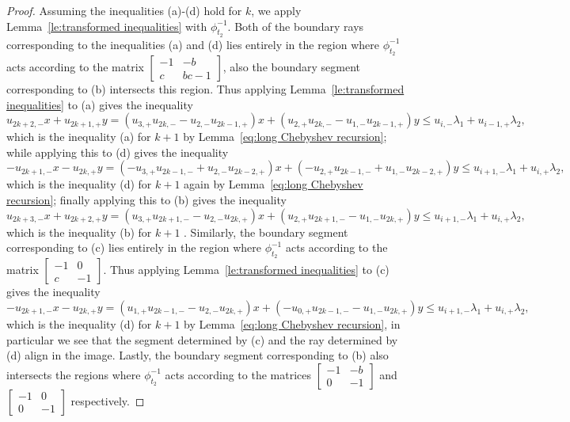 \documentclass{amsart}
\numberwithin{theorem}{section}
\begin{document}
\begin{proof}
    Assuming the inequalities (a)-(d) hold for $k$, we apply Lemma~\ref{le:transformed inequalities} with $\phi_{t_2}^{-1}$.
    Both of the boundary rays corresponding to the inequalities (a) and (d) lies entirely in the region where $\phi_{t_2}^{-1}$ acts according to the matrix $\left[ \begin{array}{cc} -1 & -b\\ c & bc-1 \end{array}\right]$, also the boundary segment corresponding to (b) intersects this region.
    Thus applying Lemma~\ref{le:transformed inequalities} to (a) gives the inequality 
    \[u_{2k+2,-}x+u_{2k+1,+}y=(u_{3,+}u_{2k,-}-u_{2,-}u_{2k-1,+})x+(u_{2,+}u_{2k,-}-u_{1,-}u_{2k-1,+})y\le u_{i,-}\lambda_1+u_{i-1,+}\lambda_2,\]
    which is the inequality (a) for $k+1$ by Lemma~\ref{eq:long Chebyshev recursion}; while applying this to (d) gives the inequality 
    \[-u_{2k+1,-}x-u_{2k,+}y=(-u_{3,+}u_{2k-1,-}+u_{2,-}u_{2k-2,+})x+(-u_{2,+}u_{2k-1,-}+u_{1,-}u_{2k-2,+})y\le u_{i+1,-}\lambda_1+u_{i,+}\lambda_2,\]
    which is the inequality (d) for $k+1$ again by Lemma~\ref{eq:long Chebyshev recursion}; finally applying this to (b) gives the inequality 
    \[u_{2k+3,-}x+u_{2k+2,+}y=(u_{3,+}u_{2k+1,-}-u_{2,-}u_{2k,+})x+(u_{2,+}u_{2k+1,-}-u_{1,-}u_{2k,+})y\le u_{i+1,-}\lambda_1+u_{i,+}\lambda_2,\]
    which is the inequality (b) for $k+1$
    .
    Similarly, the boundary segment corresponding to (c) lies entirely in the region where $\phi_{t_2}^{-1}$ acts according to the matrix $\left[ \begin{array}{cc} -1 & 0\\ c & -1 \end{array}\right]$.
    Thus applying Lemma~\ref{le:transformed inequalities} to (c) gives the inequality 
    \[-u_{2k+1,-}x-u_{2k,+}y=(u_{1,+}u_{2k-1,-}-u_{2,-}u_{2k,+})x+(-u_{0,+}u_{2k-1,-}-u_{1,-}u_{2k,+})y\le u_{i+1,-}\lambda_1+u_{i,+}\lambda_2,\]
    which is the inequality (d) for $k+1$ by Lemma~\ref{eq:long Chebyshev recursion}, in particular we see that the segment determined by (c) and the ray determined by (d) align in the image.
    Lastly, the boundary segment corresponding to (b) also intersects the regions where $\phi_{t_2}^{-1}$ acts according to the matrices $\left[ \begin{array}{cc} -1 & -b\\ 0 & -1 \end{array}\right]$ and $\left[ \begin{array}{cc} -1 & 0\\ 0 & -1 \end{array}\right]$ respectively.

\end{proof}
\end{document}
